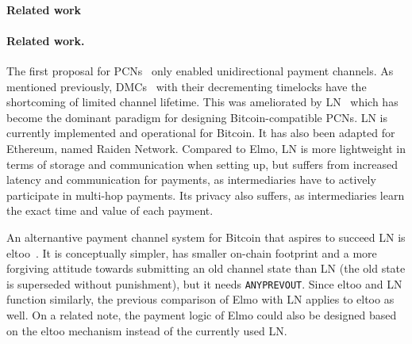 \makeatletter%
%
  {\paragraph{Related work}}%
  {\paragraph{Related work.}}%
\makeatother%
 The first proposal for PCNs~\cite{spilman} only enabled
 unidirectional payment channels. As mentioned previously, DMCs~\cite{decker}
 with their decrementing timelocks have the shortcoming of limited channel
 lifetime. This was ameliorated by LN~\cite{lightning} which has become the dominant paradigm for designing Bitcoin-compatible PCNs.
 LN is currently implemented and operational for
  Bitcoin. It has also been adapted for Ethereum, named
  Raiden Network. Compared to Elmo, LN is more lightweight in terms of
  storage and communication when setting up, but suffers from increased latency
  and communication for payments, as intermediaries have to actively participate
  in multi-hop payments. Its privacy also suffers, as intermediaries
  learn the exact time and value of each payment.

%
%

  An alternantive payment channel system for Bitcoin that aspires to
  succeed LN is eltoo~\cite{eltoo}. It is conceptually simpler,
  has smaller on-chain footprint and a more forgiving attitude towards
  submitting an old channel state than LN (the old state is superseded without punishment), but it needs
  \texttt{ANYPREVOUT}. Since eltoo and LN function similarly, the previous comparison of
  Elmo with LN applies to eltoo as well. On a related note, the payment
  logic of Elmo could also be designed based on the eltoo mechanism instead of
  the currently used LN.

